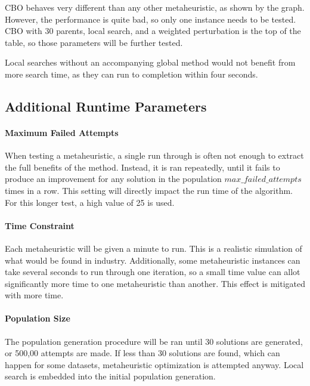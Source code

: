 \documentclass[11pt, letterpaper, onecolumn]{article}
\begin{document}
CBO behaves very different than any other metaheuristic, as shown by the graph. However, the performance is quite bad, so only one instance needs to be tested. CBO with 30 parents, local search, and a weighted perturbation is the top of the table, so those parameters will be further tested. 

Local searches without an accompanying global method would not benefit from more search time, as they can run to completion within four seconds. 


\subsection{Additional Runtime Parameters}

\paragraph{Maximum Failed Attempts}

When testing a metaheuristic, a single run through is often not enough to extract the full benefits of the method. Instead, it is ran repeatedly, until it fails to produce an improvement for any solution in the population $max\_failed\_attempts$ times in a row. This setting will directly impact the run time of the algorithm. For this longer test, a high value of 25 is used.

\paragraph{Time Constraint}

Each metaheuristic will be given a minute to run. This is a realistic simulation of what would be found in industry. Additionally, some metaheuristic instances can take several seconds to run through one iteration, so a small time value can allot significantly more time to one metaheuristic than another. This effect is mitigated with more time. 


\paragraph{Population Size}

The population generation procedure will be ran until 30 solutions are generated, or 500,00 attempts are made. If less than 30 solutions are found, which can happen for some datasets, metaheuristic optimization is attempted anyway. Local search is embedded into the initial population generation.
\end{document}

